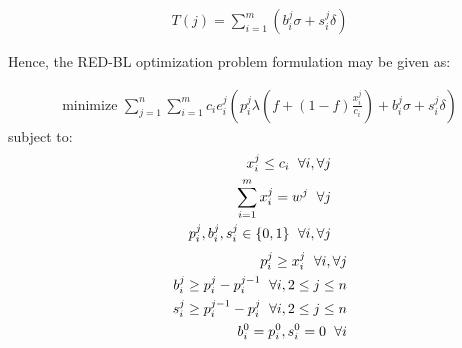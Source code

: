 \begin{align}
T (j) = \sum_{i=1}^{m} \left(b_i^j \sigma + s_i^j \delta\right)
\end{align}

Hence, the RED-BL optimization problem formulation may be given as:

\begin{align}
\text{minimize } \sum_{j=1}^{n} \sum_{i=1}^{m} c_i e_i^j\left(p_i^j \lambda\left(f+\left(1-f\right)\frac{x_i^j}{c_i}\right) + b_i^j \sigma + s_i^j \delta\right) \label{eq:objective}
\end{align}
subject to:
\begin{align}
x_i^j \le c_i \hspace{6 pt} \forall i, \forall j \label{eq:capcon}\\
\sum_{i = 1}^{m} x_i^j = w^j \hspace{6 pt} \forall j \label{eq:workcon}\\
p_i^j, b_i^j, s_i^j \in \{0,1\} \hspace{6 pt} \forall i, \forall j \label{eq:integer1}
\end{align}
\begin{align}
p_i^j \ge x_i^j \hspace{6 pt} \forall i, \forall j \label{eq:p1}\\
b_i^j \ge p_i^j - p_i^{j-1} \hspace{6 pt} \forall i, 2 \le j \le n \label{eq:bcon}\\
s_i^j \ge p_i^{j-1} - p_i^j \hspace{6 pt} \forall i, 2 \le j \le n \label{eq:scon}\\
b_i^0 = p_i^0, s_i^0 = 0 \hspace{6 pt} \forall i \label{eq:bcon1}
\end{align}

